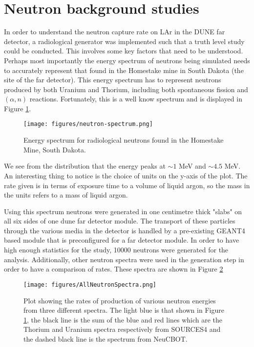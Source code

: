 \section{Neutron background studies}

In order to understand the neutron capture rate on LAr in the DUNE far detector, a radiological generator was implemented such that a truth level study could be conducted.
This involves some key factors that need to be understood.
Perhaps most importantly the energy spectrum of neutrons being simulated needs to accurately represent that found in the Homestake mine in South Dakota (the site of the far detector).
This energy spectrum has to represent neutrons produced by both Uranium and Thorium, including both spontaneous fission and $(\alpha, n)$ reactions.
Fortunately, this is a well know spectrum and is displayed in Figure \ref{fig:neutron-spectrum}.

\begin{figure}[h] %
   \centering
   \texttt{[image: figures/neutron-spectrum.png]} 
   \caption{Energy spectrum for radiological neutrons found in the Homestake Mine, South Dakota.}
   \label{fig:neutron-spectrum}
\end{figure}

We see from the distribution that the energy peaks at $\sim 1$ MeV and $\sim 4.5$ MeV.
An interesting thing to notice is the choice of units on the y-axis of the plot. 
The rate given is in terms of exposure time to a volume of liquid argon, so the mass in the units refers to a mass of liquid argon. 

Using this spectrum neutrons were generated in one centimetre thick "slabs" on all six sides of one dune far detector module.
The transport of these particles through the various media in the detector is handled by a pre-existing GEANT4 based module that is preconfigured for a far detector module.
In order to have high enough statistics for the study, 10000 neutrons were generated for the analysis.
Additionally, other neutron spectra were used in the generation step in order to have a comparison of rates.
These spectra are shown in Figure \ref{fig:allspectra}

\begin{figure}[h] %
   \centering
   \texttt{[image: figures/AllNeutronSpectra.png]} 
   \caption{Plot showing the rates of production of various neutron energies from three different spectra. The light blue is that shown in Figure \ref{fig:neutron-spectrum}, the black line is the sum of the blue and red lines which are the Thorium and Uranium spectra respectively from SOURCES4 and the dashed black line is the spectrum from NeuCBOT.}
   \label{fig:allspectra}
\end{figure}

